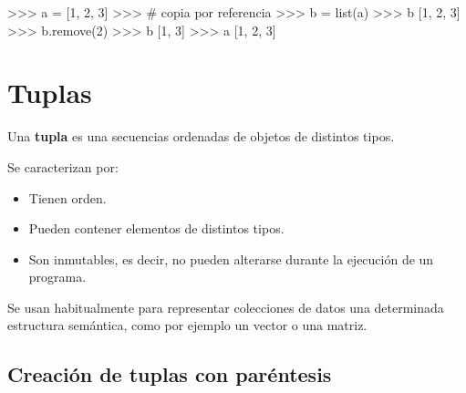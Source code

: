 \documentclass[
  spanish,
  a4paper,
]{scrreport}
\newenvironment{Shaded}{\begin{snugshade}}{\end{snugshade}}
\newcommand{\BuiltInTok}[1]{\textcolor[rgb]{0.00,0.23,0.31}{#1}}
\newcommand{\CommentTok}[1]{\textcolor[rgb]{0.37,0.37,0.37}{#1}}
\newcommand{\DecValTok}[1]{\textcolor[rgb]{0.68,0.00,0.00}{#1}}
\newcommand{\NormalTok}[1]{\textcolor[rgb]{0.00,0.23,0.31}{#1}}
\newcommand{\OperatorTok}[1]{\textcolor[rgb]{0.37,0.37,0.37}{#1}}
\providecommand{\tightlist}{%
  \setlength{\itemsep}{0pt}\setlength{\parskip}{0pt}}
\begin{document}
\begin{Shaded}
\begin{Highlighting}[]
\OperatorTok{\textgreater{}\textgreater{}\textgreater{}}\NormalTok{ a }\OperatorTok{=}\NormalTok{ [}\DecValTok{1}\NormalTok{, }\DecValTok{2}\NormalTok{, }\DecValTok{3}\NormalTok{]}
\OperatorTok{\textgreater{}\textgreater{}\textgreater{}} \CommentTok{\# copia por referencia}
\OperatorTok{\textgreater{}\textgreater{}\textgreater{}}\NormalTok{ b }\OperatorTok{=} \BuiltInTok{list}\NormalTok{(a)}
\OperatorTok{\textgreater{}\textgreater{}\textgreater{}}\NormalTok{ b}
\NormalTok{[}\DecValTok{1}\NormalTok{, }\DecValTok{2}\NormalTok{, }\DecValTok{3}\NormalTok{]}
\OperatorTok{\textgreater{}\textgreater{}\textgreater{}}\NormalTok{ b.remove(}\DecValTok{2}\NormalTok{)}
\OperatorTok{\textgreater{}\textgreater{}\textgreater{}}\NormalTok{ b}
\NormalTok{[}\DecValTok{1}\NormalTok{, }\DecValTok{3}\NormalTok{]}
\OperatorTok{\textgreater{}\textgreater{}\textgreater{}}\NormalTok{ a}
\NormalTok{[}\DecValTok{1}\NormalTok{, }\DecValTok{2}\NormalTok{, }\DecValTok{3}\NormalTok{]}
\end{Highlighting}
\end{Shaded}


\chapter{Tuplas}\label{tuplas}

Una \textbf{tupla} es una secuencias ordenadas de objetos de distintos
tipos.

Se caracterizan por:

\begin{itemize}
\tightlist
\item
  Tienen orden.
\item
  Pueden contener elementos de distintos tipos.
\item
  Son inmutables, es decir, no pueden alterarse durante la ejecución de
  un programa.
\end{itemize}

Se usan habitualmente para representar colecciones de datos una
determinada estructura semántica, como por ejemplo un vector o una
matriz.

\section{Creación de tuplas con
paréntesis}\label{creaciuxf3n-de-tuplas-con-paruxe9ntesis}
\end{document}
